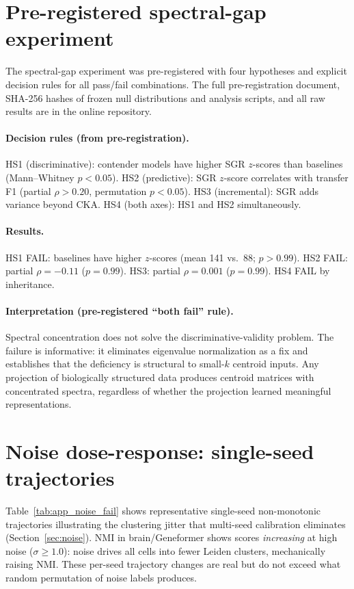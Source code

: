 \documentclass[11pt]{article}
\begin{document}
\section{Pre-registered spectral-gap experiment}
\label{app:spectral}

The spectral-gap experiment was pre-registered with four hypotheses and
explicit decision rules for all pass/fail combinations. The full
pre-registration document, SHA-256 hashes of frozen null distributions
and analysis scripts, and all raw results are in the online repository.

\paragraph{Decision rules (from pre-registration).} HS1 (discriminative):
contender models have higher SGR $z$-scores than baselines (Mann--Whitney
$p < 0.05$). HS2 (predictive): SGR $z$-score correlates with transfer
F1 (partial $\rho > 0.20$, permutation $p < 0.05$). HS3 (incremental):
SGR adds variance beyond CKA. HS4 (both axes): HS1 and HS2
simultaneously.

\paragraph{Results.} HS1 FAIL: baselines have higher $z$-scores
(mean 141 vs.\ 88; $p > 0.99$). HS2 FAIL: partial $\rho = -0.11$
($p = 0.99$). HS3: partial $\rho = 0.001$ ($p = 0.99$). HS4 FAIL by
inheritance.

\paragraph{Interpretation (pre-registered ``both fail'' rule).} Spectral
concentration does not solve the discriminative-validity problem. The
failure is informative: it eliminates eigenvalue normalization as a fix
and establishes that the deficiency is structural to small-$k$ centroid
inputs. Any projection of biologically structured data produces
centroid matrices with concentrated spectra, regardless of whether the
projection learned meaningful representations.


\section{Noise dose-response: single-seed trajectories}
\label{app:noise}

Table~\ref{tab:app_noise_fail} shows representative single-seed
non-monotonic trajectories illustrating the clustering jitter that
multi-seed calibration eliminates (Section~\ref{sec:noise}). NMI in
brain/Geneformer shows scores \emph{increasing} at high noise
($\sigma \geq 1.0$): noise drives all cells into fewer Leiden clusters,
mechanically raising NMI. These per-seed trajectory changes are real but
do not exceed what random permutation of noise labels produces.
\end{document}
